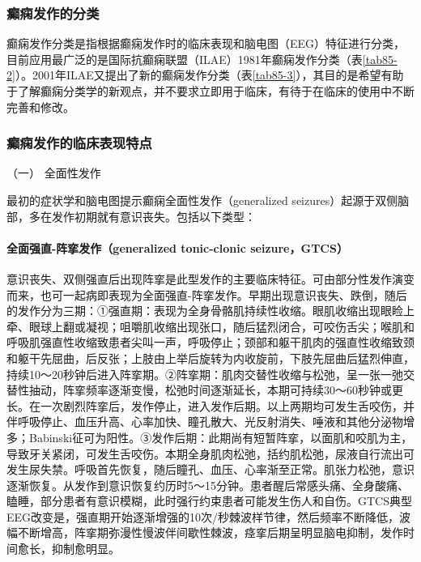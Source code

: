 \subsubsection{癫痫发作的分类}

癫痫发作分类是指根据癫痫发作时的临床表现和脑电图（EEG）特征进行分类，目前应用最广泛的是国际抗癫痫联盟（ILAE）1981年癫痫发作分类（表\ref{tab85-2}）。2001年ILAE又提出了新的癫痫发作分类（表\ref{tab85-3}），其目的是希望有助于了解癫痫分类学的新观点，并不要求立即用于临床，有待于在临床的使用中不断完善和修改。

\subsubsection{癫痫发作的临床表现特点}

\hypertarget{text00245.htmlux5cux23CHP8-2-2-2-1}{}
（一） 全面性发作

最初的症状学和脑电图提示癫痫全面性发作（generalized
seizures）起源于双侧脑部，多在发作初期就有意识丧失。包括以下类型：

\paragraph{全面强直-阵挛发作（generalized tonic-clonic seizure，GTCS）}

意识丧失、双侧强直后出现阵挛是此型发作的主要临床特征。可由部分性发作演变而来，也可一起病即表现为全面强直-阵挛发作。早期出现意识丧失、跌倒，随后的发作分为三期：①强直期：表现为全身骨骼肌持续性收缩。眼肌收缩出现眼睑上牵、眼球上翻或凝视；咀嚼肌收缩出现张口，随后猛烈闭合，可咬伤舌尖；喉肌和呼吸肌强直性收缩致患者尖叫一声，呼吸停止；颈部和躯干肌肉的强直性收缩致颈和躯干先屈曲，后反张；上肢由上举后旋转为内收旋前，下肢先屈曲后猛烈伸直，持续10～20秒钟后进入阵挛期。②阵挛期：肌肉交替性收缩与松弛，呈一张一弛交替性抽动，阵挛频率逐渐变慢，松弛时间逐渐延长，本期可持续30～60秒钟或更长。在一次剧烈阵挛后，发作停止，进入发作后期。以上两期均可发生舌咬伤，并伴呼吸停止、血压升高、心率加快、瞳孔散大、光反射消失、唾液和其他分泌物增多；Babinski征可为阳性。③发作后期：此期尚有短暂阵挛，以面肌和咬肌为主，导致牙关紧闭，可发生舌咬伤。本期全身肌肉松弛，括约肌松弛，尿液自行流出可发生尿失禁。呼吸首先恢复，随后瞳孔、血压、心率渐至正常。肌张力松弛，意识逐渐恢复。从发作到意识恢复约历时5～15分钟。患者醒后常感头痛、全身酸痛、瞌睡，部分患者有意识模糊，此时强行约束患者可能发生伤人和自伤。GTCS典型EEG改变是，强直期开始逐渐增强的10次/秒棘波样节律，然后频率不断降低，波幅不断增高，阵挛期弥漫性慢波伴间歇性棘波，痉挛后期呈明显脑电抑制，发作时间愈长，抑制愈明显。

